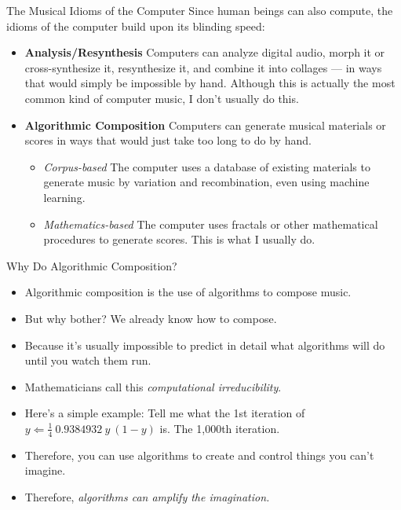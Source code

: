 \documentclass{beamer}
\begin{document}
\begin{frame}{The Musical Idioms of the Computer}
    Since human beings can also compute, the idioms of the computer build upon its blinding speed:
    \begin{itemize}
    	\item 
	    	\textbf{Analysis/Resynthesis} Computers can analyze digital audio, morph it or cross-synthesize it, resynthesize it, and combine it into collages --- in ways that would simply be impossible by hand. Although this is actually the most common kind of computer music, I don't usually do this.
	    \item
	     	\textbf{Algorithmic Composition} Computers can generate musical materials or scores in ways that would just take too long to do by hand. 
	     	\begin{itemize}
	     		\item
		     		\textit{Corpus-based} The computer uses a database of existing materials to generate music by variation and recombination, even using machine learning.
		     	\item
			     	\textit{Mathematics-based} The computer uses fractals or other mathematical procedures to generate scores. This is what I usually do.
	     	\end{itemize}
    \end{itemize}
\end{frame}

\begin{frame}{Why Do Algorithmic Composition?}
	\begin{itemize}
		\item
			Algorithmic composition is the use of algorithms to compose music.
		\item
			But why bother? We already know how to compose.
		\item
			Because it's usually impossible to predict in detail what algorithms will do until you watch them run.
		\item
			Mathematicians call this \emph{computational irreducibility}.
		\item
			Here's a simple example: Tell me what the 1st iteration of $y \Leftarrow \frac{1}{4} \: 0.9384932 \: y \: (1 -y)$ is. The 1,000th iteration.
		\item 
			Therefore, you can use algorithms to create and control things you can't imagine. 
		\item
			Therefore, \emph{algorithms can amplify the imagination.}
	\end{itemize}
\end{frame}
\end{document}
